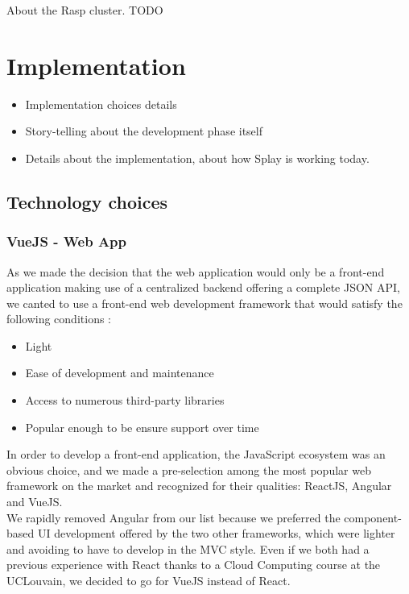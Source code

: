 \documentclass{eplmastersthesis}
\begin{document}
      About the Rasp cluster. {\color{red} TODO}



  \chapter{Implementation}


    \begin{itemize}
      \item Implementation choices details
      \item Story-telling about the development phase itself
      \item Details about the implementation, about how Splay is working today.
    \end{itemize}

    \section{Technology choices}

      \subsection{VueJS - Web App}

        As we made the decision that the web application would only be a
        front-end application making use of a centralized backend offering
        a complete JSON API, we canted to use a front-end web development
        framework that would satisfy the following conditions : \\

        \begin{itemize}
          \item Light
          \item Ease of development and maintenance
          \item Access to numerous third-party libraries
          \item Popular enough to be ensure support over time
        \end{itemize}

        In order to develop a front-end application, the JavaScript ecosystem
        was an obvious choice, and we made a pre-selection among the most
        popular web framework on the market and recognized for their qualities:
        ReactJS, Angular and VueJS.\\
        We rapidly removed Angular from our list because we preferred the
        component-based UI development offered by the two other frameworks,
        which were lighter and avoiding to have to develop in the MVC style.
        Even if we both had a previous experience with React thanks to a
        Cloud Computing course at the UCLouvain, we decided to go for VueJS
        instead of React.\\
\end{document}
